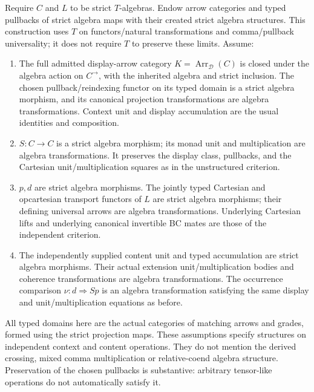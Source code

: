\documentclass[11pt]{article}
\begin{document}
Require $C$ and $L$ to be strict $T$-algebras. Endow arrow categories and typed pullbacks of strict algebra maps with their created strict algebra structures. This construction uses $T$ on functors/natural transformations and comma/pullback universality; it does not require $T$ to preserve these limits. Assume:
\begin{enumerate}
\item The full admitted display-arrow category $K=\operatorname{Arr}_{\mathcal D}(C)$ is closed under the algebra action on $C^{\to}$, with the inherited algebra and strict inclusion. The chosen pullback/reindexing functor on its typed domain is a strict algebra morphism, and its canonical projection transformations are algebra transformations. Context unit and display accumulation are the usual identities and composition.
\item $S:C\to C$ is a strict algebra morphism; its monad unit and multiplication are algebra transformations. It preserves the display class, pullbacks, and the Cartesian unit/multiplication squares as in the unstructured criterion.
\item $p,d$ are strict algebra morphisms. The jointly typed Cartesian and opcartesian transport functors of $L$ are strict algebra morphisms; their defining universal arrows are algebra transformations. Underlying Cartesian lifts and underlying canonical invertible BC mates are those of the independent criterion.
\item The independently supplied content unit and typed accumulation are strict algebra morphisms. Their actual extension unit/multiplication bodies and coherence transformations are algebra transformations. The occurrence comparison $\nu:d\Rightarrow Sp$ is an algebra transformation satisfying the same display and unit/multiplication equations as before.
\end{enumerate}
All typed domains here are the actual categories of matching arrows and grades, formed using the strict projection maps. These assumptions specify structures on independent context and content operations. They do not mention the derived crossing, mixed comma multiplication or relative-coend algebra structure. Preservation of the chosen pullbacks is substantive: arbitrary tensor-like operations do not automatically satisfy it.
\end{document}
